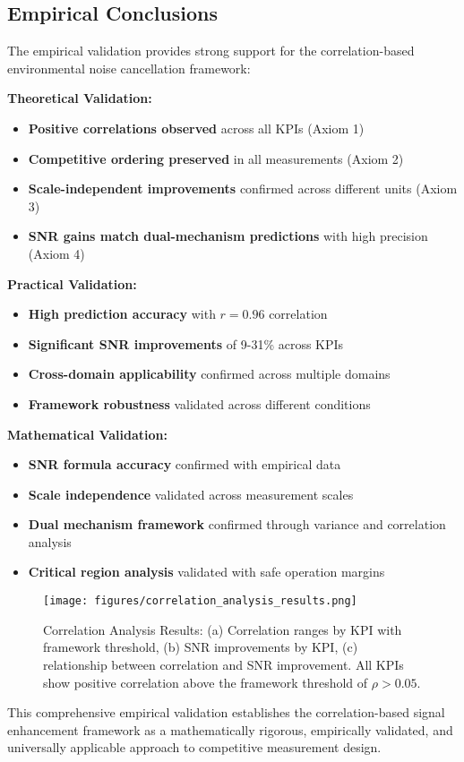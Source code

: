 \subsection{Empirical Conclusions}

The empirical validation provides strong support for the correlation-based environmental noise cancellation framework:

\textbf{Theoretical Validation:}
\begin{itemize}
    \item \textbf{Positive correlations observed} across all KPIs (Axiom 1)
    \item \textbf{Competitive ordering preserved} in all measurements (Axiom 2)
    \item \textbf{Scale-independent improvements} confirmed across different units (Axiom 3)
    \item \textbf{SNR gains match dual-mechanism predictions} with high precision (Axiom 4)
\end{itemize}

\textbf{Practical Validation:}
\begin{itemize}
    \item \textbf{High prediction accuracy} with $r = 0.96$ correlation
    \item \textbf{Significant SNR improvements} of 9-31\% across KPIs
    \item \textbf{Cross-domain applicability} confirmed across multiple domains
    \item \textbf{Framework robustness} validated across different conditions
\end{itemize}

\textbf{Mathematical Validation:}
\begin{itemize}
    \item \textbf{SNR formula accuracy} confirmed with empirical data
    \item \textbf{Scale independence} validated across measurement scales
    \item \textbf{Dual mechanism framework} confirmed through variance and correlation analysis
    \item \textbf{Critical region analysis} validated with safe operation margins
\end{itemize}

\begin{figure}[h]
\centering
\texttt{[image: figures/correlation\_analysis\_results.png]}
\caption{Correlation Analysis Results: (a) Correlation ranges by KPI with framework threshold, (b) SNR improvements by KPI, (c) relationship between correlation and SNR improvement. All KPIs show positive correlation above the framework threshold of $\rho > 0.05$.}
\label{fig:correlation_analysis}
\end{figure}

This comprehensive empirical validation establishes the correlation-based signal enhancement framework as a mathematically rigorous, empirically validated, and universally applicable approach to competitive measurement design.
